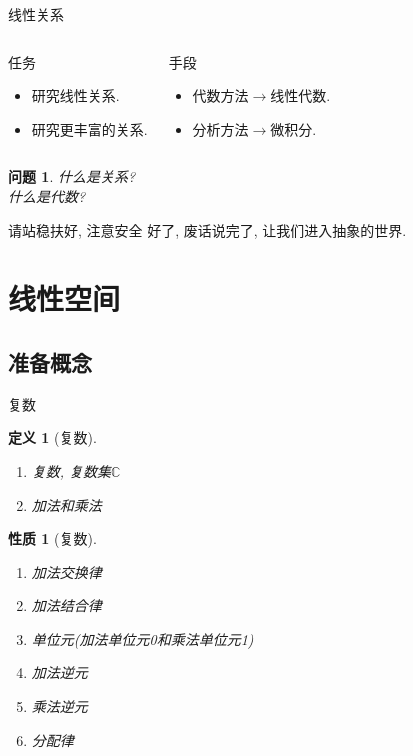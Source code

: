 \documentclass[11pt]{beamer}
\newtheorem{prob}{问题}[section]
\newtheorem{defi}{定义}[section]
\newtheorem{prop}{性质}[section]
\begin{document}
\begin{frame}{线性关系}
\begin{columns}
	\begin{block}{任务}
		\begin{itemize}
			\item 研究线性关系.
			\item 研究更丰富的关系.
		\end{itemize}
	\end{block}
	\begin{block}{手段}
		\begin{itemize}
			\item 代数方法$\rightarrow$线性代数.
			\item 分析方法$\rightarrow$微积分.
		\end{itemize}
	\end{block}
\end{columns}
\begin{prob}
	什么是关系?\\
	什么是代数?
\end{prob}
\end{frame}

\begin{frame}{请站稳扶好, 注意安全}
好了, 废话说完了, 让我们进入抽象的世界.
\end{frame}

\section{线性空间}

\frame{\sectionpage}

\subsection{准备概念}

\frame{\subsectionpage}

\begin{frame}{复数}
	\begin{defi}[复数]
		\begin{enumerate}
			\item 复数, 复数集$\mathbb{C}$
			\item 加法和乘法
		\end{enumerate}
	\end{defi}
	\begin{prop}[复数]
		\begin{enumerate}
			\item 加法交换律
			\item 加法结合律
			\item 单位元(加法单位元0和乘法单位元1)
			\item 加法逆元
			\item 乘法逆元
			\item 分配律
		\end{enumerate}
	\end{prop}
\end{frame}
\end{document}
